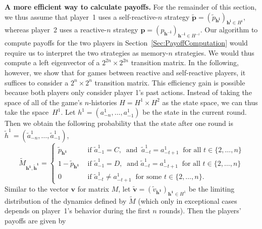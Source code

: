 \documentclass[11pt]{article}
\theoremstyle{plainCl1}
\theoremstyle{plainCl2}
\begin{document}
\noindent
{\bf A more efficient way to calculate payoffs.}
For the remainder of this section, we thus assume that player~1 uses a self-reactive-$n$ strategy $\mathbf{\tilde p}\!=\!(\tilde p_\mathbf{h^i})_{\mathbf{h^i}\in H^i}$, whereas player~2 uses a reactive-$n$ strategy $\mathbf{p}\!=\!(p_\mathbf{h^{-i}})_{\mathbf{h^{-i}}\in H^{-i}}$. 
Our algorithm to compute payoffs for the two players in Section~\ref{Sec:PayoffComputation} would require us to interpret the two strategies as memory-$n$ strategies. 
We would thus compute a left eigenvector of a $2^{2n}\!\times\!2^{2n}$ transition matrix. 
In the following, however, we show that for games between reactive and self-reactive players, it suffices to consider a $2^n\!\times\!2^n$ transition matrix.
This efficiency gain is possible because both players only consider player 1's past actions.  
Instead of taking the space of all of the game's $n$-histories $H\!=\!H^1\!\times\! H^2$  as the state space, we can thus take the space~$H^1$. 
Let \(h^1=(a^1_{-n},\ldots,a^1_{-1})\) be the state in the current round. 
Then we obtain the following probability that the state after one round is  \(\tilde{h}^1=(\tilde{a}^1_{-n},\ldots,\tilde{a}^1_{-1})\),\begin{equation}\label{Eq:TransitionMatrixSelfReactive}
\tilde{M}_{\mathbf{h^1},\mathbf{ \tilde{h}^1}} = 
\begin{cases}
  \tilde{p}_\mathbf{h^1} & \text{ if } \tilde{a}^1_{-1}\! =\! C,~\text{ and }~\tilde{a}^1_{-t} \!=\! a^1_{-t + 1}~\text{ for all } t\!\in\!\{2,\ldots,n\}\\
  1 - \tilde{p}_\mathbf{h^1} & \text{ if } \tilde{a}^1_{-1}\!=\! D,~\text{ and } \tilde{a}^1_{-t} \!=\! a^1_{-t + 1}~\text{ for all } t\!\in\!\{2,\ldots,n\}\\
  0 & \text{ if } \tilde{a}^1_{-t} \!\neq\!  a^1_{-t + 1}~ \text{ for some } t\!\in\!\{2,\ldots,n\}.
\end{cases}
\end{equation}
Similar to the vector $\mathbf{v}$ for matrix $M$, let $\mathbf{\tilde{v}}\!=\!(\tilde{v}_\mathbf{h^1})_{\mathbf{h^1}\in H^1}$ be the limiting distribution of the dynamics defined by $\tilde M$ (which only in exceptional cases depends on player~1's behavior during the first $n$ rounds). Then the players' payoffs are given by
\end{document}
